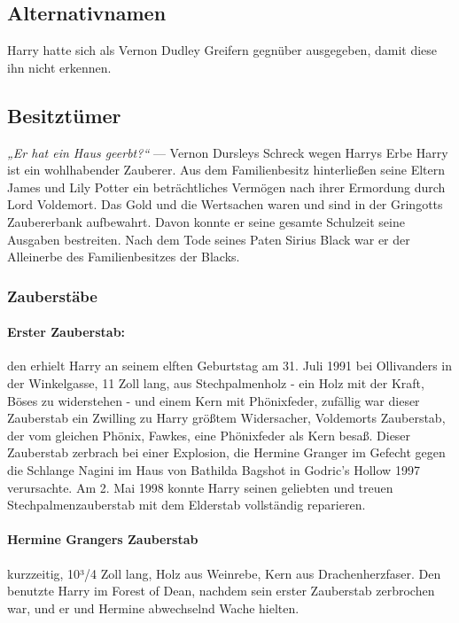 \documentclass[a4paper, 10pt]{article}
\begin{document}
\subsection*{\Large Alternativnamen}
Harry hatte sich als Vernon Dudley Greifern gegnüber ausgegeben, damit diese ihn nicht erkennen.
\subsection*{\Large Besitztümer}
\textit{„Er hat ein Haus geerbt?“}
\vspace{10pt}
\newline
{}  
— Vernon Dursleys Schreck wegen Harrys Erbe
\vspace{10pt}
\newline
{}  
Harry ist ein wohlhabender Zauberer. Aus dem Familienbesitz hinterließen seine Eltern James und Lily Potter ein beträchtliches
Vermögen nach ihrer Ermordung durch Lord Voldemort. Das Gold und die Wertsachen waren und sind in der Gringotts Zaubererbank aufbewahrt. Davon konnte er seine gesamte Schulzeit seine Ausgaben bestreiten. Nach dem Tode seines Paten Sirius Black war er der Alleinerbe des Familienbesitzes der Blacks.
\subsubsection*{\large Zauberstäbe}
\paragraph{Erster Zauberstab:}
den erhielt Harry an seinem elften Geburtstag am 31. Juli 1991 bei Ollivanders in der Winkelgasse, 11 Zoll lang, aus Stechpalmenholz - ein Holz mit der Kraft, Böses zu widerstehen - und einem Kern mit Phönixfeder, zufällig war dieser Zauberstab ein Zwilling zu Harry größtem Widersacher, Voldemorts Zauberstab, der vom gleichen Phönix, Fawkes, eine Phönixfeder als Kern besaß. Dieser Zauberstab zerbrach bei einer Explosion, die Hermine Granger im Gefecht gegen die Schlange Nagini im Haus von Bathilda Bagshot in Godric's Hollow 1997 verursachte. Am 2. Mai 1998 konnte Harry seinen geliebten und treuen Stechpalmenzauberstab mit dem Elderstab vollständig reparieren.
\paragraph{Hermine Grangers Zauberstab}
kurzzeitig, 10³/4 Zoll lang, Holz aus Weinrebe, Kern aus Drachenherzfaser. Den benutzte Harry im Forest of Dean, nachdem sein erster Zauberstab zerbrochen war, und er und Hermine abwechselnd Wache hielten.
\end{document}
